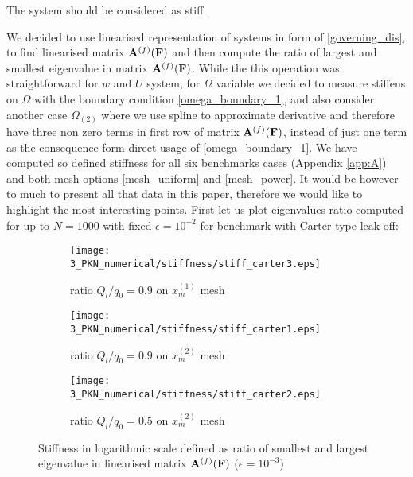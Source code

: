 The system should be considered as stiff.

We decided to use linearised representation of systems in form of \eqref{governing_dis}, to find linearised matrix ${\bf A}^{(f)}(\bf F)$ and then compute the ratio of largest and smallest eigenvalue in matrix  ${\bf A}^{(f)}(\bf F)$. While the this operation was straightforward for $w$ and $U$ system, for $\Omega$ variable we decided to measure stiffens on $\Omega$ with the boundary condition \eqref{omega_boundary_1}, and also consider another case $\Omega_{(2)}$ where we use spline to approximate derivative and therefore have three non zero terms in first row of matrix  ${\bf A}^{(f)}(\bf F)$, instead of just one term as the consequence form direct usage of \eqref{omega_boundary_1}. We have computed so defined stiffness for all six benchmarks cases (Appendix \ref{app:A}) and both mesh options \eqref{mesh_uniform} and \eqref{mesh_power}. It would be however to much to present all that data in this paper, therefore we would like to highlight the most interesting points.
First let us plot eigenvalues ratio computed for up to $N=1000$ with fixed $\epsilon=10^{-2}$ for benchmark with Carter type leak off:

\begin{figure*}
        \begin{subfigure}[b]{0.33\textwidth}
                \centering
                \texttt{[image: 3\_PKN\_numerical/stiffness/stiff\_carter3.eps]}
                \caption{ratio $Q_l/q_0=0.9$ on $x_m^{(1)}$ mesh}
                \label{s_plot3}
        \end{subfigure}
        \begin{subfigure}[b]{0.33\textwidth}
                \centering
                \texttt{[image: 3\_PKN\_numerical/stiffness/stiff\_carter1.eps]}
                \caption{ratio $Q_l/q_0=0.9$ on $x_m^{(2)}$ mesh }
                \label{s_plot1}
        \end{subfigure}
        \begin{subfigure}[b]{0.33\textwidth}
                \centering
                \texttt{[image: 3\_PKN\_numerical/stiffness/stiff\_carter2.eps]}
                \caption{ratio $Q_l/q_0=0.5$ on $x_m^{(2)}$ mesh }
                \label{s_plot2}
        \end{subfigure}
\caption{Stiffness in logarithmic scale defined as ratio of smallest and largest eigenvalue in linearised matrix  ${\bf A}^{(f)}(\bf F)$ ($\epsilon=10^{-3}$)}
\label{fig:stiffness_a}
\end{figure*}

